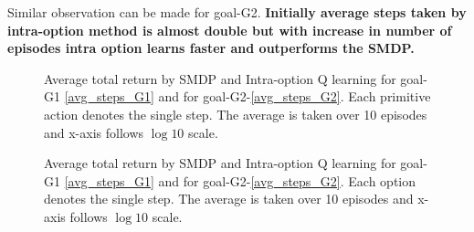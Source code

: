 \documentclass[preprint,12pt]{elsarticle}
\begin{document}
 Similar observation can be made for goal-G2. \textbf{Initially average steps taken by intra-option method is almost double but with increase in number of episodes intra option learns faster and outperforms the SMDP.} 
 
  
 \begin{figure}[H]
 	\centering  
 	\caption{Average total return by SMDP and Intra-option Q learning for goal-G1 \ref{avg_steps_G1} and for goal-G2-\ref{avg_steps_G2}. Each primitive action denotes the single step. The average is taken over 10 episodes and x-axis follows $\log 10$ scale.}
 	\label{fig:action}
 \end{figure}
 
  \begin{figure}[H]
  	\centering  
  	\caption{Average total return by SMDP and Intra-option Q learning for goal-G1 \ref{avg_steps_G1} and for goal-G2-\ref{avg_steps_G2}. Each option denotes the single step. The average is taken over 10 episodes and x-axis follows $\log 10$ scale.}
  	\label{fig:options}
  \end{figure}
 
\end{document}

